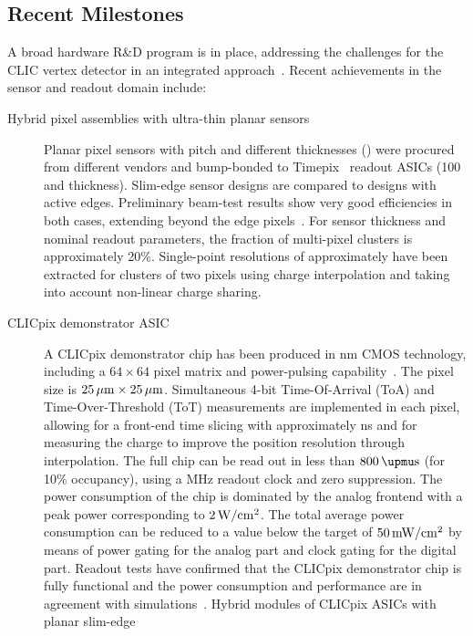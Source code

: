 \subsection{Recent Milestones}
A broad hardware R\&D program is in place, addressing the challenges for the CLIC
vertex detector in an integrated approach~\cite{1748-0221-10-03-C03025}. Recent achievements
in the sensor and readout domain include:
\begin{description}
\item[Hybrid pixel assemblies with ultra-thin planar sensors]
Planar pixel sensors with \unit[55]{\micron} pitch and different thicknesses (\unit[50--300]{\micron})
were procured from different vendors and bump-bonded to Timepix~\cite{Llopart2007485} readout
ASICs (100 and \unit[700]{\micron} thickness).
Slim-edge sensor designs are compared to designs
with active edges.
Preliminary beam-test results show very good efficiencies in both cases, extending beyond the
edge pixels~\cite{Redford:1966932}.
For \unit[50]{\micron} sensor thickness and nominal readout parameters, the fraction of multi-pixel clusters
is approximately 20\%.
Single-point resolutions of approximately \unit[3]{\micron} have been extracted
for clusters of two pixels using charge interpolation and taking into account
non-linear charge sharing.
\item[CLICpix demonstrator ASIC]
A CLICpix demonstrator chip has been produced in \unit[65]{nm} CMOS technology,
including a $64 \times 64$ pixel matrix and power-pulsing capability~\cite{Valerio:1507691}.
The pixel size is $\unit[25]{\micron}\times\unit[25]{\micron}$. Simultaneous
4-bit Time-Of-Arrival (ToA) and Time-Over-Threshold (ToT) measurements
are implemented in each pixel, allowing for a front-end time slicing
with approximately \unit[10]{ns} and for measuring the charge
to improve the position resolution through interpolation.
The full chip can be read out in less than
$\unit[800]{\upmu s}$ (for 10\% occupancy), using a \unit[320]{MHz} readout clock and zero suppression.
The
power consumption of the chip is dominated by the analog frontend
with a peak power corresponding to $\unit[2]{W/cm^2}$. The total average power
consumption can be reduced to a value below the target of $\unit[50]{mW/cm^2}$
by means of power gating for the analog part and clock gating for the digital part.
Readout tests have confirmed that the CLICpix demonstrator chip
is fully functional and the power consumption and performance are in agreement with
simulations~\cite{Valerio:1635171}.
Hybrid modules of CLICpix ASICs with planar slim-edge

\end{description}
